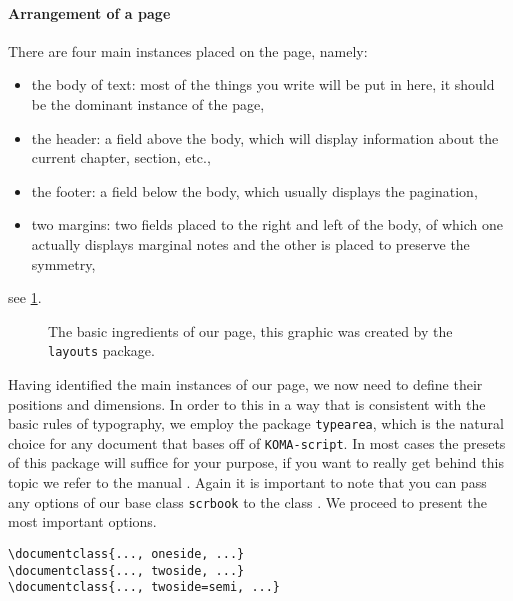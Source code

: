 \paragraph{Arrangement of a page} There are four main instances placed on the page, namely:
\begin{itemize}
\item the body of text: most of the things you write will be put in here, it should 
be the dominant instance of the page,
\item the header: a field above the body, which will display information about the 
current chapter, section, etc.,
\item the footer: a field below the body, which usually displays the pagination,
\item two margins: two fields placed to the right and left of the body, of which one 
actually displays marginal notes and the other is placed to preserve the symmetry,
\end{itemize}
see \cref{fig:play}. 
\begin{figure}
\currentpage
{}
\printheadingsfalse
\printparametersfalse
\marginparswitchtrue
\pagedesign
\caption[Page arrangement]{The basic ingredients of our page, this graphic was created by the 
		\texttt{layouts} package.} \label{fig:play}
\end{figure}
Having identified the main instances of our page, we now need to 
define their positions and dimensions. In order to this in a way that is consistent with 
the basic rules of typography, we employ the package \texttt{typearea}, which is the 
natural choice for any document that bases off of \texttt{KOMA-script}. 
In most cases the presets of this package will suffice for your purpose, if you want to 
really get behind this topic we refer to the manual \cite{koma20}. Again it is important 
to note that you can pass any options of our base class \texttt{scrbook} to the class 
\texttt{\classname}. We proceed to present the most important options.
\begin{emphBox}
\lstinline[language={[LaTeX]TeX}]|\documentclass{..., oneside, ...}|\\
\lstinline[language={[LaTeX]TeX}]|\documentclass{..., twoside, ...}|\\
\lstinline[language={[LaTeX]TeX}]|\documentclass{..., twoside=semi, ...}|
\end{emphBox}
